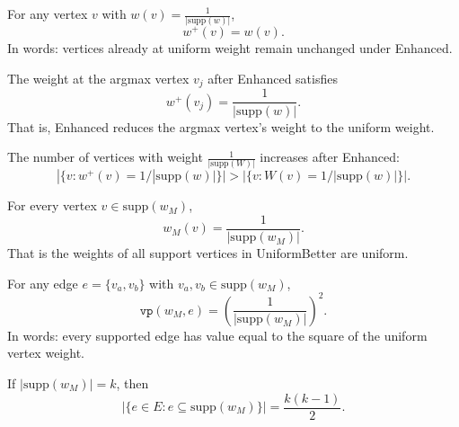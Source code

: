 \begin{lemma}
    \label{lem:Enhanced_unaffected}
For any vertex \(v\) with \(w(v) = \frac{1}{|\mathrm{supp}(w)|}\),
\[
w^+(v) = w(v).
\]
In words: vertices already at uniform weight remain unchanged under Enhanced.
\end{lemma}

\begin{lemma}
    \label{lem:Enhanced_effect_argmax}
The weight at the argmax vertex \(v_j\) after Enhanced satisfies
\[
w^+(v_j) = \frac{1}{|\mathrm{supp}(w)|}.
\]
That is, Enhanced reduces the argmax vertex's weight to the uniform weight.
\end{lemma}

\begin{lemma}
    \label{lem:Enhanced_inc_uniform_count}
The number of vertices with weight \(\frac{1}{|\mathrm{supp}(W)|}\) increases after Enhanced:
\[
|\{ v : w^+(v) = 1/|\mathrm{supp}(w)| \}| > |\{ v : W(v) = 1/|\mathrm{supp}(w)| \}|.
\]
\end{lemma}

\begin{lemma}
  \label{lem:UniformBetter_constant_support}
  \leanok
For every vertex \(v \in \mathrm{supp}(w_M)\),
\[
w_M(v) = \frac{1}{|\mathrm{supp}(w_M)|}.
\]
That is the weights of all support vertices in UniformBetter are uniform.
\end{lemma}

\begin{lemma}
  \label{lem:UniformBetter_edges_value}
  \leanok
For any edge \(e = \{v_a, v_b\}\) with \(v_a, v_b \in \mathrm{supp}(w_M)\),
\[
\texttt{vp}(w_M, e) = \left(\frac{1}{|\mathrm{supp}(w_M)|}\right)^2.
\]
In words: every supported edge has value equal to the square of the uniform vertex weight.
\end{lemma}

\begin{lemma}
  \label{lem:clique_size}
  \leanok
If \(|\mathrm{supp}(w_M)| = k\), then
\[
|\{ e \in E : e \subseteq \mathrm{supp}(w_M) \}| = \frac{k(k-1)}{2}.
\]
\end{lemma}

